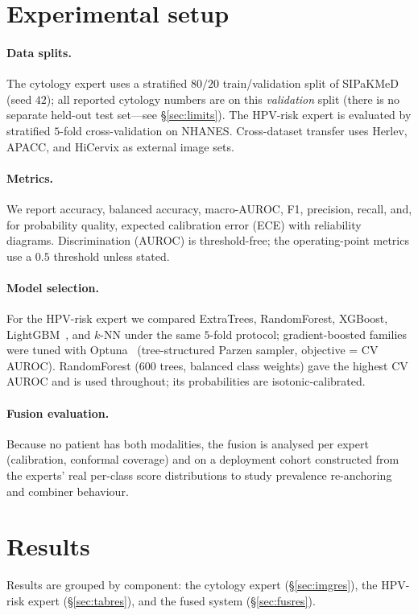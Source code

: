 \documentclass[sigplan,nonacm,screen]{acmart}
\begin{document}
\section{Experimental setup}\label{sec:setup}
\paragraph{Data splits.} The cytology expert uses a stratified $80/20$ train/validation split of SIPaKMeD
(seed $42$); all reported cytology numbers are on this \emph{validation} split (there is no separate held-out
test set---see \S\ref{sec:limits}). The HPV-risk expert is evaluated by stratified $5$-fold cross-validation
on NHANES. Cross-dataset transfer uses Herlev, APACC, and HiCervix as external image sets.
\paragraph{Metrics.} We report accuracy, balanced accuracy, macro-AUROC, F1, precision, recall, and, for
probability quality, expected calibration error (ECE) with reliability diagrams. Discrimination (AUROC) is
threshold-free; the operating-point metrics use a $0.5$ threshold unless stated.
\paragraph{Model selection.} For the HPV-risk expert we compared ExtraTrees, RandomForest, XGBoost,
LightGBM~\cite{ke2017lightgbm}, and $k$-NN under the same $5$-fold protocol; gradient-boosted families were
tuned with Optuna~\cite{akiba2019optuna} (tree-structured Parzen sampler, objective = CV AUROC). RandomForest
($600$ trees, balanced class weights) gave the highest CV AUROC and is used throughout; its probabilities are
isotonic-calibrated.
\paragraph{Fusion evaluation.} Because no patient has both modalities, the fusion is analysed per expert
(calibration, conformal coverage) and on a deployment cohort constructed from the experts' real per-class
score distributions to study prevalence re-anchoring and combiner behaviour.

\section{Results}
Results are grouped by component: the cytology expert (\S\ref{sec:imgres}), the HPV-risk expert
(\S\ref{sec:tabres}), and the fused system (\S\ref{sec:fusres}).
\end{document}
